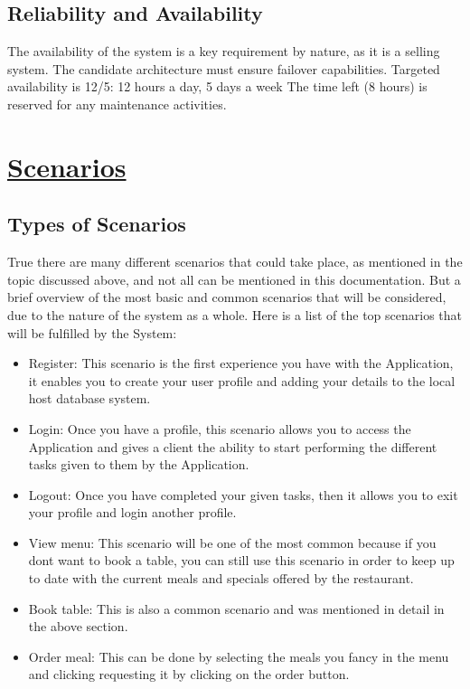 \documentclass{article}
\begin{document}
\subsection{Reliability and Availability}
The availability of the system is a key requirement by nature, as it is a selling
system. The candidate architecture must ensure failover capabilities. Targeted
availability is 12/5: 12 hours a day, 5 days a week The time left (8 hours) is
reserved for any maintenance activities.


\pagebreak


\pagebreak

\pagebreak
\section{\underline{Scenarios}}
\subsection{{Types of Scenarios}}
True there are many different scenarios that could take place, as mentioned in the topic discussed above, and not all can be mentioned in this documentation. But a brief overview of the most basic and common scenarios that will be considered, due to the nature of the system as a whole. Here is a list of the top scenarios that will be fulfilled by the System:
\begin{itemize}
\item Register: This scenario is the first experience you have with the Application, it enables you to create your user profile and adding your details to the local host database system.
\item Login: Once you have a profile, this scenario allows you to access the Application and gives a client the ability to start performing the different tasks given to them by the Application. 
\item Logout: Once you have completed your given tasks, then it allows you to exit your profile and login another profile.
\item View menu: This scenario will be one of the most common because if you dont want to book a table, you can still use this scenario in order to keep up to date with the current meals and specials offered by the restaurant.
\item Book table: This is also a common scenario and was mentioned in detail in the above section.
\item Order meal: This can be done by selecting the meals you fancy in the menu and clicking requesting it by clicking on the order button. 
\end{itemize}
\end{document}

